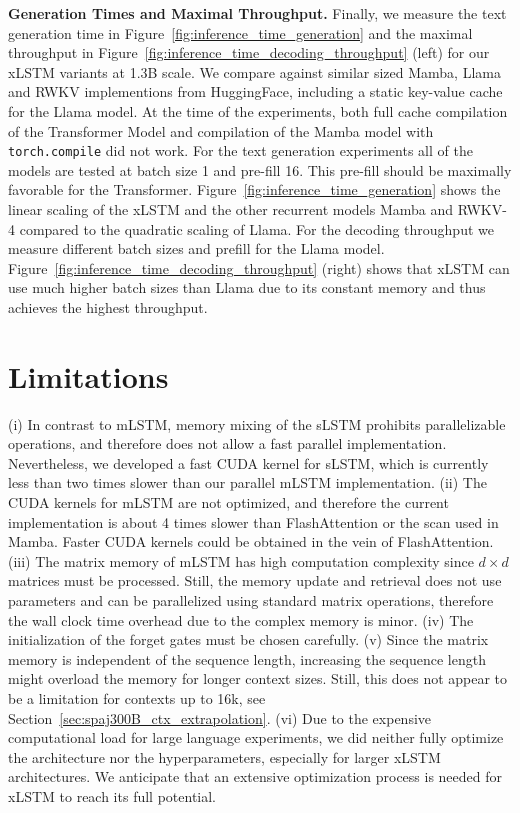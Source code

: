 \textbf{Generation Times and Maximal Throughput.} Finally, we measure the text generation time in Figure~\ref{fig:inference_time_generation} and the maximal throughput in Figure~\ref{fig:inference_time_decoding_throughput} (left) for our xLSTM variants at 1.3B scale. We compare against similar sized Mamba, Llama and RWKV implementions from HuggingFace, including a static key-value cache for the Llama model. At the time of the experiments, both full cache compilation of the Transformer Model and compilation of the Mamba model with \texttt{torch.compile} did not work. For the text generation experiments all of the models are tested at batch size 1 and pre-fill 16. This pre-fill should be maximally favorable for the Transformer.
Figure~\ref{fig:inference_time_generation} shows the linear scaling of the xLSTM and the other recurrent models Mamba and RWKV-4 compared to the quadratic scaling of Llama. For the decoding throughput we measure different batch sizes and prefill for the Llama model. 
Figure~\ref{fig:inference_time_decoding_throughput} (right) shows that xLSTM can use much higher batch sizes than Llama due to its constant memory and thus achieves the highest throughput.

\section{Limitations}

(i) In contrast to mLSTM, memory mixing of the sLSTM prohibits parallelizable operations, and therefore does not allow a fast parallel implementation. Nevertheless, we developed a fast CUDA kernel for sLSTM, which is currently less than two times slower than our parallel mLSTM implementation. (ii) The CUDA kernels for mLSTM are not optimized, and therefore the current implementation is about 4 times slower than FlashAttention or the scan used in Mamba. Faster CUDA kernels could be obtained in the vein of FlashAttention. (iii) The matrix memory of mLSTM has high computation complexity since $d \times d$ matrices must be processed. Still, the memory update and retrieval does not use parameters and can be parallelized using standard matrix operations, therefore the wall clock time overhead due to the complex memory is minor. (iv) The initialization of the forget gates must be chosen carefully. (v) Since the matrix memory is independent of the sequence length, increasing the sequence length might overload the memory for longer context sizes. Still, this does not appear to be a limitation for contexts up to 16k, see Section~\ref{sec:spaj300B_ctx_extrapolation}.
(vi) Due to the expensive computational load for large language experiments, we did neither fully optimize the architecture nor the hyperparameters, especially for larger xLSTM architectures. We anticipate that an extensive optimization process is needed for xLSTM to reach its full potential.

